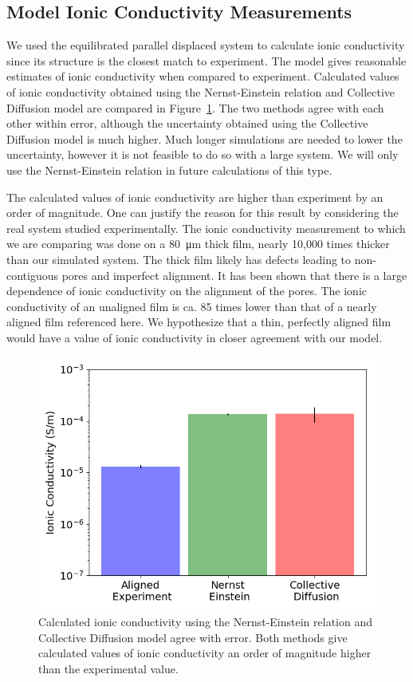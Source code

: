 \documentclass{article}
\begin{document}
  \subsection{Model Ionic Conductivity Measurements}

  We used the equilibrated parallel displaced system to calculate ionic
  conductivity since its structure is the closest match to experiment. The model
  gives reasonable estimates of ionic conductivity when compared to experiment.
  Calculated values of ionic conductivity obtained using the Nernst-Einstein
  relation and Collective Diffusion model are compared in
  Figure~\ref{fig:conductivity}. The two methods agree with each other within
  error, although the uncertainty obtained using the Collective Diffusion model
  is much higher. Much longer simulations are needed to lower the uncertainty,
  however it is not feasible to do so with a large system. We will only use the
  Nernst-Einstein relation in future calculations of this type. 

  The calculated values of ionic conductivity are higher than experiment by an
  order of magnitude. One can justify the reason for this result by considering
  the real system studied experimentally. The ionic conductivity measurement to
  which we are comparing was done on a \SI{80}{\micro\metre} thick film, nearly
  10,000 times thicker than our simulated system. The thick film likely has
  defects leading to non-contiguous pores and imperfect alignment.  It has been
  shown that there is a large dependence of ionic conductivity on the alignment
  of the pores. The ionic conductivity of an unaligned film is ca. 85 times lower
  than that of a nearly aligned film referenced here. We hypothesize that a thin,
  perfectly aligned film would have a value of ionic conductivity in closer
  agreement with our model.
 
  \begin{figure}
        \centering
        \includegraphics[width=0.5\linewidth]{IC_offset.png}
        \caption{Calculated ionic conductivity using the Nernst-Einstein relation
        and Collective Diffusion model agree with error. Both methods give calculated
        values of ionic conductivity an order of magnitude higher than the experimental
        value.}
        \label{fig:conductivity}
  \end{figure}
\end{document}
